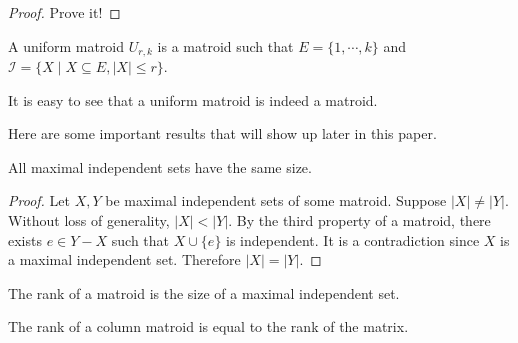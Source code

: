 \begin{proof}
Prove it!
\end{proof}


\begin{defn}
A uniform matroid $U_{r, k}$ is a matroid such that $E = \{ 1, \cdots, k \}$ and $\mathcal{I} = \{ X \mid  X \subseteq E, \lvert X \rvert \leq r \}$.
\end{defn}

It is easy to see that a uniform matroid is indeed a matroid.

Here are some important results that will show up later in this paper.

\begin{thm}
All maximal independent sets have the same size.
\end{thm}

\begin{proof}
Let $X, Y$ be maximal independent sets of some matroid.
Suppose $\lvert X \rvert \neq \lvert Y \rvert$.
Without loss of generality, $\lvert X \rvert < \lvert Y \rvert$.
By the third property of a matroid, there exists $e \in Y - X$ such that $X \cup \{ e \}$ is independent.
It is a contradiction since $X$ is a maximal independent set.
Therefore $\lvert X \rvert = \lvert Y \rvert$.
\end{proof}

\begin{defn}
The rank of a matroid is the size of a maximal independent set.
\end{defn}

\begin{defn}
The rank of a column matroid is equal to the rank of the matrix.
\end{defn}
